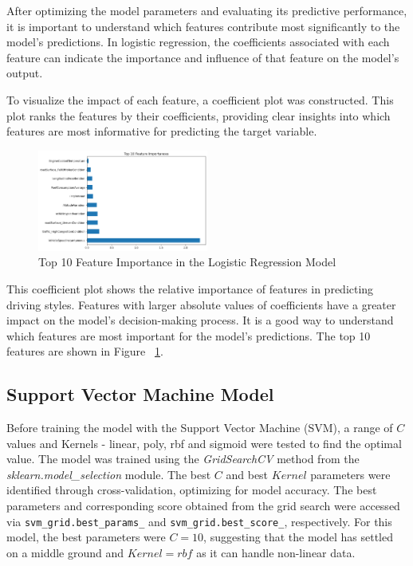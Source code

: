 \documentclass[10pt,journal,compsoc]{IEEEtran}
\begin{document}
After optimizing the model parameters and evaluating its predictive performance, it is important to understand which features contribute most significantly to the model's predictions. 
In logistic regression, the coefficients associated with each feature can indicate the importance and influence of that feature on the model's output. 

To visualize the impact of each feature, a coefficient plot was constructed. This plot ranks the features by their coefficients, providing clear insights into which features are 
most informative for predicting the target variable.

\begin{figure}[h]
    \centering
    \includegraphics[width=0.5\textwidth]{images/feature_importance.png} 
    \caption{Top 10 Feature Importance in the Logistic Regression Model}
    \label{fig:feature_importances}
\end{figure}

This coefficient plot shows the relative importance of features in predicting driving styles. Features with larger absolute values of coefficients have a greater impact on the model's 
decision-making process. It is a good way to understand which features are most important for the model's predictions. The top 10 features are shown in Figure ~\ref{fig:feature_importances}.


\subsection{Support Vector Machine Model}
Before training the model with the Support Vector Machine (SVM), a range of $C$ values and Kernels - linear, poly, rbf and sigmoid were tested to find the optimal value. The model 
was trained using the \textit{GridSearchCV} method from the \textit{sklearn.model\_selection} module. The best $C$ and best $Kernel$ parameters were identified through cross-validation, optimizing for model accuracy. 
The best parameters and corresponding score obtained from the grid search were accessed via \texttt{svm\_grid.best\_params\_} and \texttt{svm\_grid.best\_score\_}, respectively. For this model, the best parameters were $C=10$, 
suggesting that the model has settled on a middle ground and $Kernel=rbf$ as it can handle non-linear data.
\end{document}
